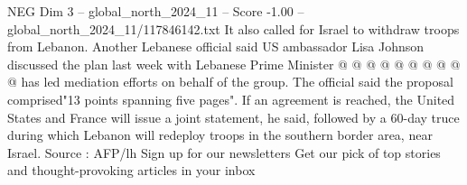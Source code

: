 \begin{textsample}{NEG Dim 3 – global\_north\_2024\_11 – Score -1.00 – global\_north\_2024\_11/117846142.txt}
It also called for Israel to withdraw troops from Lebanon.
Another Lebanese official said US ambassador Lisa Johnson discussed the plan last week with Lebanese Prime Minister @ @ @ @ @ @ @ @ @ @ has led mediation efforts on behalf of the group.
The official said the proposal comprised"13 points spanning five pages".
If an agreement is reached, the United States and France will issue a joint statement, he said, followed by a 60-day truce during which Lebanon will redeploy troops in the southern border area, near Israel.
Source : AFP/lh Sign up for our newsletters Get our pick of top stories and thought-provoking articles in your inbox

\end{textsample}
